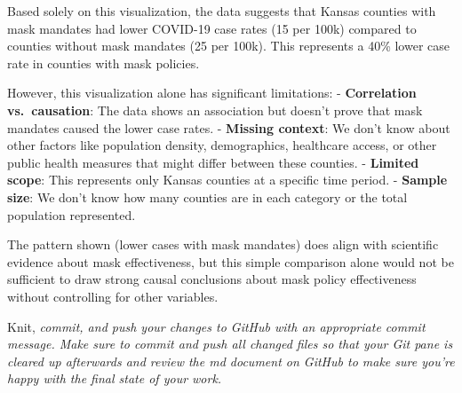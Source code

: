 \documentclass[
]{article}
\begin{document}
Based solely on this visualization, the data suggests that Kansas
counties with mask mandates had lower COVID-19 case rates (15 per 100k)
compared to counties without mask mandates (25 per 100k). This
represents a 40\% lower case rate in counties with mask policies.

However, this visualization alone has significant limitations: -
\textbf{Correlation vs.~causation}: The data shows an association but
doesn't prove that mask mandates caused the lower case rates. -
\textbf{Missing context}: We don't know about other factors like
population density, demographics, healthcare access, or other public
health measures that might differ between these counties. -
\textbf{Limited scope}: This represents only Kansas counties at a
specific time period. - \textbf{Sample size}: We don't know how many
counties are in each category or the total population represented.

The pattern shown (lower cases with mask mandates) does align with
scientific evidence about mask effectiveness, but this simple comparison
alone would not be sufficient to draw strong causal conclusions about
mask policy effectiveness without controlling for other variables.

Knit, \emph{commit, and push your changes to GitHub with an appropriate
commit message. Make sure to commit and push all changed files so that
your Git pane is cleared up afterwards and review the md document on
GitHub to make sure you're happy with the final state of your work.}
\end{document}
